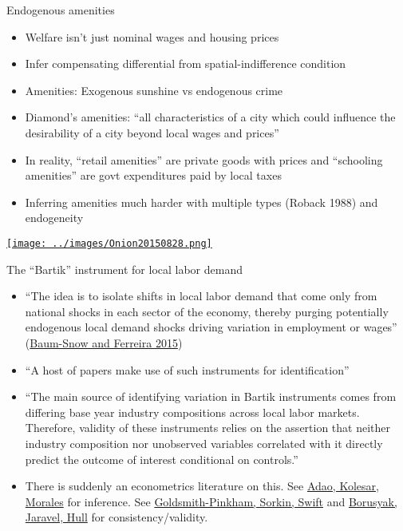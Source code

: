 \documentclass[10pt,notes=hide]{beamer}
\begin{document}
\begin{frame}{Endogenous amenities}
\begin{itemize}
	\item Welfare isn't just nominal wages and housing prices
	\item Infer compensating differential from spatial-indifference condition
	\item Amenities: Exogenous sunshine vs endogenous crime
	\item Diamond's amenities: ``all characteristics of a city which could influence the desirability of a city beyond local wages and prices''
	\item In reality, ``retail amenities'' are private goods with prices and ``schooling amenities'' are govt expenditures paid by local taxes
	\item Inferring amenities much harder with multiple types (Roback 1988) and endogeneity
\end{itemize}
\vspace{4mm}
\href{https://local.theonion.com/neighborhood-starting-to-get-too-safe-for-family-to-aff-1819578182}{\texttt{[image: ../images/Onion20150828.png]}}
\end{frame}
\begin{frame}{The ``Bartik'' instrument for local labor demand}
\begin{itemize}
	\item {\small ``The idea is to isolate shifts in local labor demand that come only from national shocks in each sector of the economy, thereby purging potentially endogenous local demand shocks driving variation in employment or wages'' (\href{https://ideas.repec.org/h/eee/regchp/5-3.html}{Baum-Snow and Ferreira 2015})}
	\item ``A host of papers make use of such instruments for identification''
	\item {\small ``The main source of identifying variation in Bartik instruments comes from differing base year industry compositions across local labor markets. Therefore, validity of these instruments relies on the assertion that neither industry composition nor unobserved variables correlated with it directly predict the outcome of interest conditional on controls.''}
	\item There is suddenly an econometrics literature on this. 
	See \href{https://sites.google.com/site/rradao/research}{Adao, Kolesar, Morales} for inference.
	See \href{https://paulgp.github.io/papers.html}{Goldsmith-Pinkham, Sorkin, Swift} and \href{http://about.peterhull.net/wp}{Borusyak, Jaravel, Hull} for consistency/validity.
\end{itemize}
\end{frame}
\end{document}
